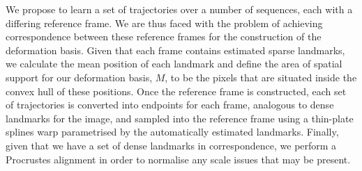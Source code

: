 We propose to learn a set of trajectories over a number of sequences, each with
a differing reference frame. We are thus faced with the problem
of achieving correspondence between these reference frames for the construction
of the deformation basis. Given that each frame contains estimated sparse landmarks,
we calculate the mean position of each landmark and define the area of spatial support
for our deformation basis, $M$, to be the pixels that are situated inside the
convex hull of these positions. Once the reference frame is constructed,
each set of trajectories is converted into endpoints for each frame, analogous
to dense landmarks for the image, and sampled into the reference frame using
a thin-plate splines warp parametrised by the automatically estimated landmarks.
Finally, given that we have a set of dense landmarks in correspondence, we perform a
Procrustes alignment in order to normalise any scale issues that may be present.
